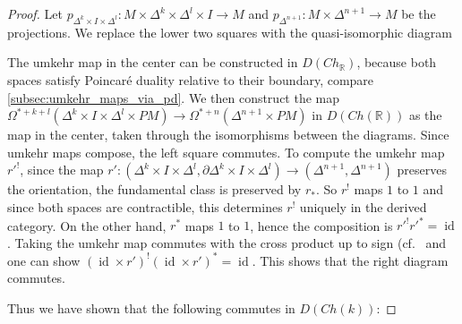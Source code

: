 \documentclass{scrartcl}
\theoremstyle{plain}
\theoremstyle{definition}
\newcommand{\R}{\mathbb R}
\DeclareMathOperator{\id}{id}
\newcommand{\comp}{\mathbin{\circ}}
\begin{document}
\begin{proof}
    Let $p_{\Delta^k\times I\times\Delta^l}\colon M\times\Delta^k\times\Delta^l\times I \to M$ and $p_{\Delta^{n+1}}\colon M\times \Delta^{n+1}\to M$ be the projections. We replace the lower two squares with the quasi-isomorphic diagram
    \begin{center}
    \end{center}
    The umkehr map in the center can be constructed in $D(Ch_\R)$, because both spaces satisfy Poincaré duality relative to their boundary, compare \cref{subsec:umkehr_maps_via_pd}. 
    We then construct the map $\Omega^{*+k+l}(\Delta^k\times I\times \Delta^l\times PM)\to \Omega^{*+n}(\Delta^{n+1}\times PM)$ in $D(Ch(\R))$ as the map in the center, taken through the isomorphisms between the diagrams. Since umkehr maps compose, the left square commutes. To compute the umkehr map $r'^!$, since the map $r'\colon (\Delta^k\times I\times \Delta^l, \partial \Delta^k\times I\times \Delta^l)\to (\Delta^{n+1}, \Delta^{n+1})$ preserves the orientation, the fundamental class is preserved by $r_*$. So $r^!$ maps $1$ to $1$ and since both spaces are contractible, this determines $r^!$ uniquely in the derived category. On the other hand, $r^*$ maps $1$ to $1$, hence the composition is $r'^! r'^* = \id$. Taking the umkehr map commutes with the cross product up to sign (cf.~\cite[Prop. 14.3]{bredon2013topology} and one can show $(\id\times r')^!(\id\times r')^* = \id$. This shows that the right diagram commutes. 

    Thus we have shown that the following commutes in $D(Ch(k))$: 


\end{proof}
\end{document}
